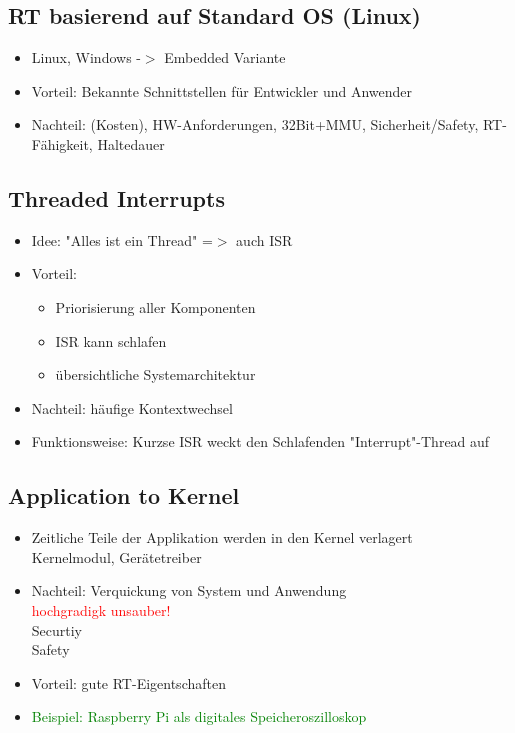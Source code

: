 \documentclass[12pt,a4paper,oneside,ngerman]{article}
\begin{document}
\subsection{RT basierend auf Standard OS (Linux)}
\begin{itemize}
	\item Linux, Windows -$>$ Embedded Variante
	\item Vorteil: Bekannte Schnittstellen für Entwickler und Anwender
	\item Nachteil: (Kosten), HW-Anforderungen, 32Bit+MMU, Sicherheit/Safety, RT-Fähigkeit, Haltedauer
\end{itemize}

\subsection{Threaded Interrupts}
\begin{itemize}
	\item Idee: "Alles ist ein Thread" =$>$ auch ISR
	\item Vorteil: 
	\begin{itemize}
		\item Priorisierung aller Komponenten
		\item ISR kann schlafen
		\item übersichtliche Systemarchitektur	
	\end{itemize}
	\item Nachteil: häufige Kontextwechsel
	\item Funktionsweise: Kurzse ISR weckt den Schlafenden "Interrupt"-Thread auf
\end{itemize}

\subsection{Application to Kernel}
\begin{itemize}
	\item Zeitliche Teile der Applikation werden in den Kernel verlagert \\ 
	 Kernelmodul, Gerätetreiber
	\item Nachteil: Verquickung von System und Anwendung \\ 
	 \textcolor{red}{hochgradigk unsauber!} \\
	 Securtiy \\
	 Safety
	\item Vorteil: gute RT-Eigentschaften
	\item \textcolor{green}{Beispiel: Raspberry Pi als digitales Speicheroszilloskop}
\end{itemize} 
\end{document}
